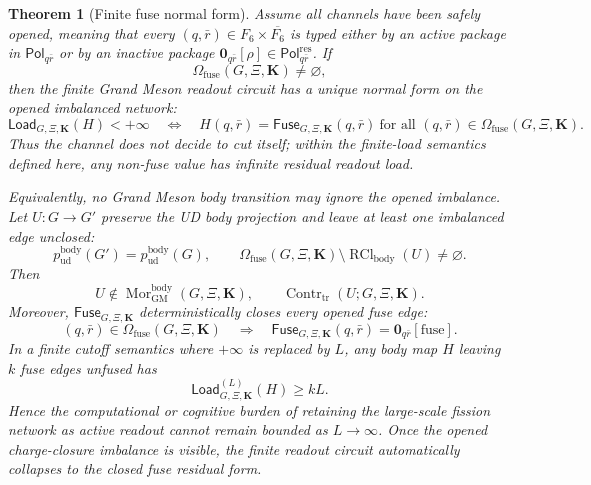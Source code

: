 \documentclass[11pt]{article}
\theoremstyle{definition}
\theoremstyle{plain}
\newtheorem{theorem}[definition]{Theorem}
\DeclareMathOperator{\Contr}{Contr}
\DeclareMathOperator{\Mor}{Mor}
\DeclareMathOperator{\RCl}{RCl}
\newcommand{\qu}{\mathrm u}
\newcommand{\qd}{\mathrm d}
\begin{document}
\begin{theorem}[Finite fuse normal form]
Assume all channels have been safely opened, meaning that every
\((q,\bar r)\in F_6\times\overline{F_6}\) is typed either by an active
package in \(\mathsf{Pol}_{q\bar r}\) or by an inactive package
\(\mathbf 0_{q\bar r}[\rho]\in\mathsf{Pol}^{\mathrm{res}}_{q\bar r}\).
If
\[
  \Omega_{\mathrm{fuse}}(G,\Xi,\mathbf K)\ne\varnothing,
\]
then the finite Grand Meson readout circuit has a unique normal form on the
opened imbalanced network:
\[
  \mathsf{Load}_{G,\Xi,\mathbf K}(H)<+\infty
  \quad\Longleftrightarrow\quad
  H(q,\bar r)=\mathsf{Fuse}_{G,\Xi,\mathbf K}(q,\bar r)
  \ \text{for all }(q,\bar r)\in\Omega_{\mathrm{fuse}}(G,\Xi,\mathbf K).
\]
Thus the channel does not decide to cut itself; within the finite-load
semantics defined here, any non-fuse value has infinite residual readout
load.

Equivalently, no Grand Meson body transition may ignore the opened
imbalance.  Let \(U:G\to G'\) preserve the UD body projection and leave at
least one
imbalanced edge unclosed:
\[
  p^{\mathrm{body}}_{\qu\qd}(G')=p^{\mathrm{body}}_{\qu\qd}(G),
  \qquad
  \Omega_{\mathrm{fuse}}(G,\Xi,\mathbf K)
  \setminus\RCl_{\mathrm{body}}(U)\ne\varnothing .
\]
Then
\[
  U\notin\Mor^{\mathrm{body}}_{\mathrm{GM}}(G,\Xi,\mathbf K),
  \qquad
  \Contr_{\mathrm{tr}}(U;G,\Xi,\mathbf K).
\]
Moreover, \(\mathsf{Fuse}_{G,\Xi,\mathbf K}\) deterministically closes every
opened fuse edge:
\[
  (q,\bar r)\in\Omega_{\mathrm{fuse}}(G,\Xi,\mathbf K)
  \quad\Longrightarrow\quad
  \mathsf{Fuse}_{G,\Xi,\mathbf K}(q,\bar r)
  =
  \mathbf 0_{q\bar r}[\mathrm{fuse}].
\]
In a finite cutoff semantics where \(+\infty\) is replaced by \(L\), any
body map \(H\) leaving \(k\) fuse edges unfused has
\[
  \mathsf{Load}^{(L)}_{G,\Xi,\mathbf K}(H)\ge kL .
\]
Hence the computational or cognitive burden of retaining the large-scale
fission network as active readout cannot remain bounded as \(L\to\infty\).
Once the opened charge-closure imbalance is visible, the finite readout
circuit automatically collapses to the closed fuse residual form.
\end{theorem}
\end{document}
